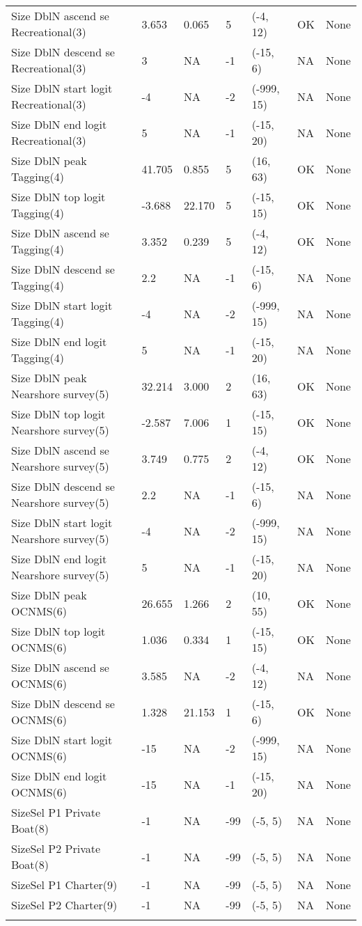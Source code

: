 \documentclass[11pt,
  english,
  letterpaper,
]{article}
\begin{document}
\begin{landscape}
\begin{longtable}[t]{>{\raggedright\arraybackslash}p{7.5cm}lllll>{\raggedright\arraybackslash}p{3.5cm}}
Size DblN ascend se Recreational(3) & 3.653 & 0.065 & 5 & (-4, 12) & OK & None\\
Size DblN descend se Recreational(3) & 3 & NA & -1 & (-15, 6) & NA & None\\
Size DblN start logit Recreational(3) & -4 & NA & -2 & (-999, 15) & NA & None\\
Size DblN end logit Recreational(3) & 5 & NA & -1 & (-15, 20) & NA & None\\
Size DblN peak Tagging(4) & 41.705 & 0.855 & 5 & (16, 63) & OK & None\\
Size DblN top logit Tagging(4) & -3.688 & 22.170 & 5 & (-15, 15) & OK & None\\
Size DblN ascend se Tagging(4) & 3.352 & 0.239 & 5 & (-4, 12) & OK & None\\
Size DblN descend se Tagging(4) & 2.2 & NA & -1 & (-15, 6) & NA & None\\
Size DblN start logit Tagging(4) & -4 & NA & -2 & (-999, 15) & NA & None\\
Size DblN end logit Tagging(4) & 5 & NA & -1 & (-15, 20) & NA & None\\
Size DblN peak Nearshore survey(5) & 32.214 & 3.000 & 2 & (16, 63) & OK & None\\
Size DblN top logit Nearshore survey(5) & -2.587 & 7.006 & 1 & (-15, 15) & OK & None\\
Size DblN ascend se Nearshore survey(5) & 3.749 & 0.775 & 2 & (-4, 12) & OK & None\\
Size DblN descend se Nearshore survey(5) & 2.2 & NA & -1 & (-15, 6) & NA & None\\
Size DblN start logit Nearshore survey(5) & -4 & NA & -2 & (-999, 15) & NA & None\\
Size DblN end logit Nearshore survey(5) & 5 & NA & -1 & (-15, 20) & NA & None\\
Size DblN peak OCNMS(6) & 26.655 & 1.266 & 2 & (10, 55) & OK & None\\
Size DblN top logit OCNMS(6) & 1.036 & 0.334 & 1 & (-15, 15) & OK & None\\
Size DblN ascend se OCNMS(6) & 3.585 & NA & -2 & (-4, 12) & NA & None\\
Size DblN descend se OCNMS(6) & 1.328 & 21.153 & 1 & (-15, 6) & OK & None\\
Size DblN start logit OCNMS(6) & -15 & NA & -2 & (-999, 15) & NA & None\\
Size DblN end logit OCNMS(6) & -15 & NA & -1 & (-15, 20) & NA & None\\
SizeSel P1 Private Boat(8) & -1 & NA & -99 & (-5, 5) & NA & None\\
SizeSel P2 Private Boat(8) & -1 & NA & -99 & (-5, 5) & NA & None\\
SizeSel P1 Charter(9) & -1 & NA & -99 & (-5, 5) & NA & None\\
SizeSel P2 Charter(9) & -1 & NA & -99 & (-5, 5) & NA & None\\*
\end{longtable}
\endgroup{}
\end{landscape}
\endgroup{}
\end{document}
